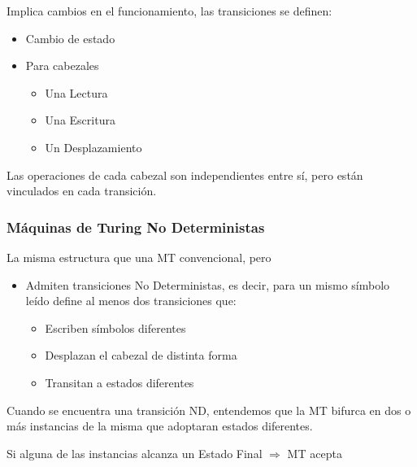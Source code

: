 Implica cambios en el funcionamiento, las transiciones se definen:
\begin{itemize}
    \item Cambio de estado
    \item Para cabezales
    \begin{itemize}
        \item Una Lectura
        \item Una Escritura
        \item Un Desplazamiento
    \end{itemize}
\end{itemize}

Las operaciones de cada cabezal son independientes entre sí, pero están vinculados en cada transición.

\subsubsection{Máquinas de Turing No Deterministas}
La misma estructura que una MT convencional, pero
\begin{itemize}
    \item Admiten transiciones No Deterministas, es decir, para un mismo símbolo leído define al menos dos transiciones que:
    \begin{itemize}
        \item Escriben símbolos diferentes
        \item Desplazan el cabezal de distinta forma
        \item Transitan a estados diferentes
    \end{itemize}
\end{itemize}

Cuando se encuentra una transición ND, entendemos que la MT bifurca en dos o más instancias de la misma que adoptaran estados diferentes.

Si alguna de las instancias alcanza un Estado Final $\Rightarrow$ MT acepta
